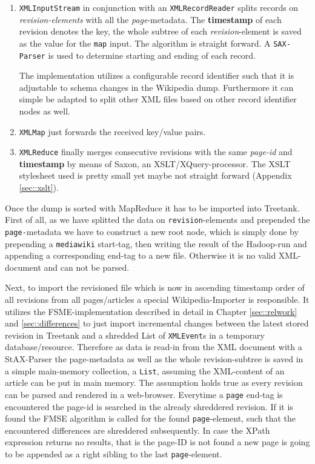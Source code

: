 \begin{enumerate}
\item \texttt{XMLInputStream} in conjunction with an \texttt{XMLRecordReader} splits records on \emph{revision-elements} with all the \emph{page}-metadata. The \textbf{timestamp} of each revision denotes the key, the whole subtree of each \emph{revision}-element is saved as the value for the \texttt{map} input. The algorithm is straight forward. A \texttt{SAX-Parser} is used to determine starting and ending of each record.

The implementation utilizes a configurable record identifier such that it is adjustable to schema changes in the Wikipedia dump. Furthermore it can simple be adapted to split other XML files based on other record identifier nodes as well.

\item \texttt{XMLMap} just forwards the received key/value pairs.
\item \texttt{XMLReduce} finally merges consecutive revisions with the same \emph{page-id} and \textbf{timestamp} by means of Saxon, an XSLT/XQuery-processor. The XSLT stylesheet used is pretty small yet maybe not straight forward (Appendix \ref{sec::xslt}).
\end{enumerate}

Once the dump is sorted with MapReduce it has to be imported into Treetank. First of all, as we have splitted the data on \texttt{revision}-elements and pre\-pen\-ded the \texttt{page-}metadata we have to construct a new root node, which is simply done by prepending a \texttt{mediawiki} start-tag, then writing the result of the Hadoop-run and appending a corresponding end-tag to a new file. Otherwise it is no valid XML-document and can not be parsed.

Next, to import the revisioned file which is now in ascending timestamp order of all revisions from all pages/articles a special Wikipedia-Importer is responsible. It utilizes the FSME-implementation described in detail in Chapter \ref{sec::relwork} and \ref{sec::differences} to just import incremental changes between the latest stored revision in Treetank and a shredded List of \texttt{XMLEvent}s in a temporary database/resource. Therefore as data is read-in from the XML document with a StAX-Parser the page-metadata as well as the whole revision-subtree is saved in a simple main-memory collection, a \texttt{List}, assuming the XML-content of an article can be put in main memory. The assumption holds true as every revision can be parsed and rendered in a web-browser. Everytime a \texttt{page} end-tag is encountered the page-id is searched in the already shreddered revision. If it is found the FMSE algorithm is called for the found \texttt{page}-element, such that the encountered differences are shreddered subsequently. In case the XPath expression returns no results, that is the page-ID is not found a new page is going to be appended as a right sibling to the last \texttt{page}-element.

